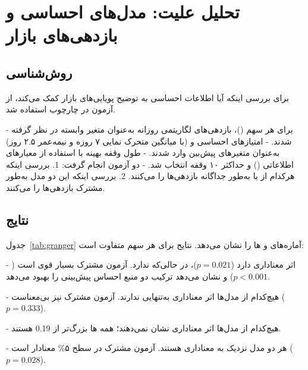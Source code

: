 \documentclass[12pt, a4paper]{report}
\begin{document}
\section{تحلیل علیت: مدل‌های احساسی و بازدهی‌های بازار}

\subsection{روش‌شناسی}
برای بررسی اینکه آیا اطلاعات احساسی به توضیح پویایی‌های بازار کمک می‌کند، 
از آزمون  در چارچوب  استفاده شد.  

- برای هر سهم ()، بازدهی‌های لگاریتمی روزانه به‌عنوان متغیر وابسته در نظر گرفته شدند.  
- امتیازهای احساسی  و  (با میانگین متحرک نمایی ۷ روزه و نیمه‌عمر ۲.۵ روز) به‌عنوان متغیرهای پیش‌بین وارد شدند.  
- طول وقفه بهینه با استفاده از معیارهای اطلاعاتی () و حداکثر ۱۰ وقفه انتخاب شد.  
- دو آزمون انجام گرفت:  
  1. بررسی اینکه هرکدام از  یا  به‌طور جداگانه بازدهی‌ها را  می‌کنند.  
  2. بررسی اینکه این دو مدل به‌طور مشترک بازدهی‌ها را  می‌کنند.  

\subsection{نتایج}
جدول~\ref{tab:granger} آماره‌های  و ‌ها را نشان می‌دهد. نتایج برای هر سهم متفاوت است:  

-   اثر معناداری دارد ($p=0.021$)، در حالی‌که  ندارد.  
  آزمون مشترک بسیار قوی است ($p<0.001$) و نشان می‌دهد ترکیب دو منبع احساس پیش‌بینی را بهبود می‌دهد.  

-  هیچ‌کدام از مدل‌ها اثر معناداری به‌تنهایی ندارند.  
  آزمون مشترک نیز بی‌معناست ($p=0.333$).  

-  هیچ‌کدام از مدل‌ها اثر معناداری نشان نمی‌دهند؛ همه ‌ها بزرگ‌تر از 0.19 هستند.  

-  هر دو مدل نزدیک به معناداری هستند.  
  آزمون مشترک در سطح ۵\% معنادار است ($p=0.028$).  
\end{document}
